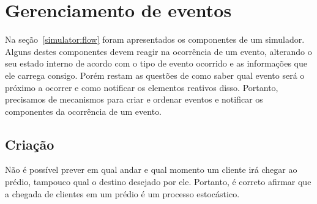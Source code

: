 \section{\label{sec:model:event}Gerenciamento de eventos}

Na seção~\ref{simulator:flow} foram apresentados os componentes de um simulador.
Alguns destes componentes devem reagir na ocorrência de um evento, alterando o
seu estado interno de acordo com o tipo de evento ocorrido e as informações que
ele carrega consigo. Porém restam as questões de como saber qual evento será o
próximo a ocorrer e como notificar os elementos reativos disso. Portanto,
precisamos de mecanismos para criar e ordenar eventos e notificar os componentes
da ocorrência de um evento.

\subsection{Criação} \label{model:event:creation}

Não é possível prever em qual andar e qual momento um cliente irá chegar ao
prédio, tampouco qual o destino desejado por ele. Portanto, é correto afirmar
que a chegada de clientes em um prédio é um processo estocástico.

